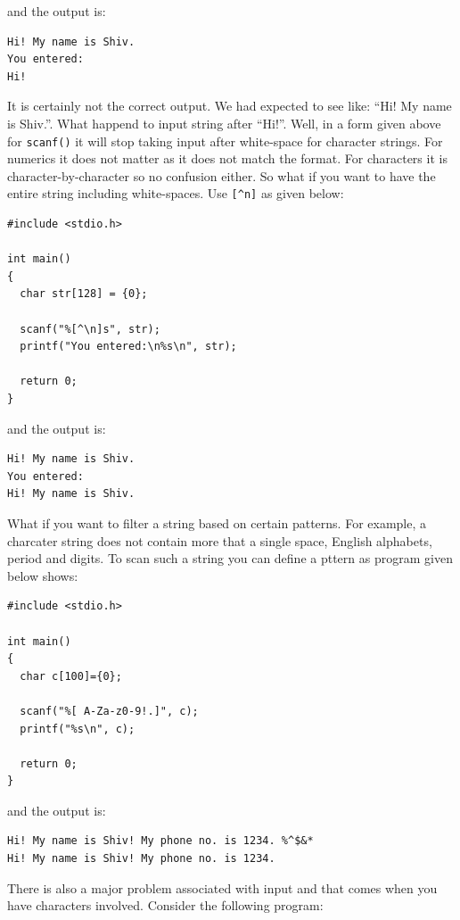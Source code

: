 and the output is:

\begin{verbatim}
Hi! My name is Shiv.
You entered:
Hi!
\end{verbatim}

It is certainly not the correct output. We had expected to see like: ``Hi! My
name is Shiv.''. What happend to input string after ``Hi!''. Well, in a form
given above for \texttt{scanf()} it will stop taking input after white-space
for character strings. For numerics it does not matter as it does not match the
format. For characters it is character-by-character so no confusion either. So
what if you want to have the entire string including white-spaces. Use
\texttt{[\^{}n]} as given below:

\begin{verbatim}
#include <stdio.h>

int main()
{
  char str[128] = {0};

  scanf("%[^\n]s", str);
  printf("You entered:\n%s\n", str);

  return 0;
}
\end{verbatim}

and the output is:

\begin{verbatim}
Hi! My name is Shiv.
You entered:
Hi! My name is Shiv.
\end{verbatim}

What if you want to filter a string based on certain patterns. For example, a
charcater string does not contain more that a single space, English alphabets,
period and digits. To scan such a string you can define a pttern as program
given below shows:

\begin{verbatim}
#include <stdio.h>

int main()
{
  char c[100]={0};

  scanf("%[ A-Za-z0-9!.]", c);
  printf("%s\n", c);

  return 0;
}
\end{verbatim}

and the output is:

\begin{verbatim}
Hi! My name is Shiv! My phone no. is 1234. %^$&*
Hi! My name is Shiv! My phone no. is 1234.
\end{verbatim}

There is also a major problem associated with input and that comes when you
have characters involved. Consider the following program:

